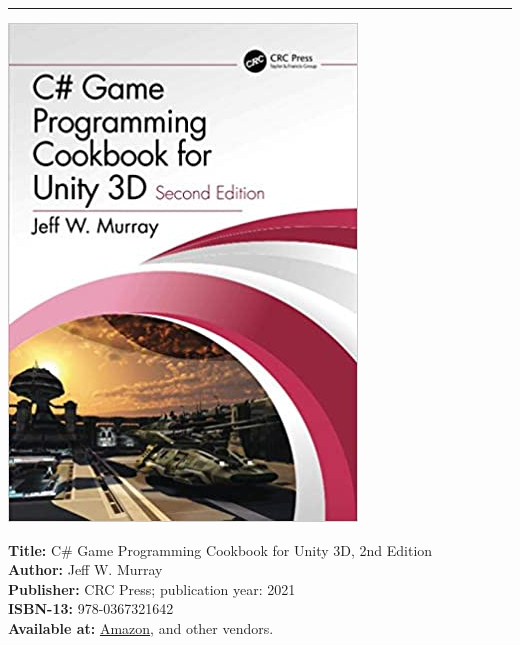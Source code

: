 \documentclass[11pt, a4paper]{article}
\begin{document}
\hrule
\vspace{.1cm}
\begin{minipage}[b]{0.17\linewidth}          
	\includegraphics[width=.95\linewidth]{includes/images/UnityCookbook.jpg}
\end{minipage}\hfill
\begin{minipage}[b]{0.75\linewidth}          
	\noindent \textbf{Title:} C\# Game Programming Cookbook for Unity 3D, 2nd Edition \\
	\textbf{Author:} Jeff W. Murray \\
	\textbf{Publisher:} CRC Press; publication year: 2021  \\
	\textbf{ISBN-13:} 978-0367321642\\         
	\textbf{Available at:}     
	\href{https://www.amazon.ca/dp/0367321645/}{Amazon},
	and other vendors. \\
\end{minipage}
\\
\end{document}
